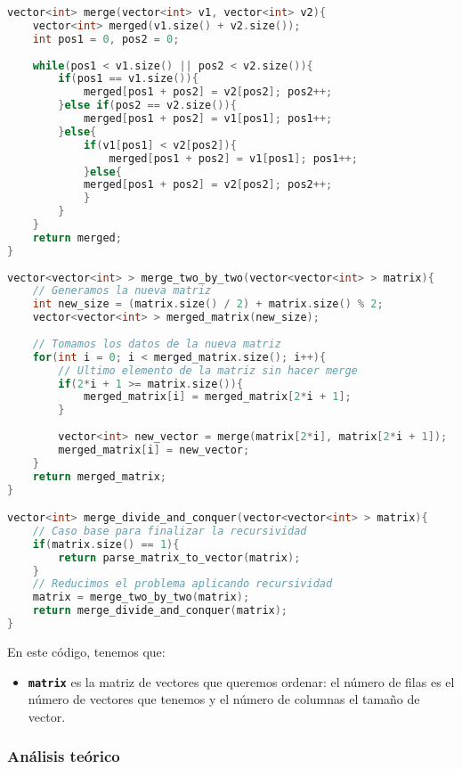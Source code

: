 \documentclass[10pt, a4paper]{article}
\theoremstyle{theorem-style}
\theoremstyle{theorem-style}
\theoremstyle{definition-style}
\theoremstyle{remark-style}
\theoremstyle{example-style}
\theoremstyle{definition-style}
\theoremstyle{remark-style}
\begin{document}
\begin{lstlisting}[language=C]
vector<int> merge(vector<int> v1, vector<int> v2){
	vector<int> merged(v1.size() + v2.size());
	int pos1 = 0, pos2 = 0;
	
	while(pos1 < v1.size() || pos2 < v2.size()){
		if(pos1 == v1.size()){
			merged[pos1 + pos2] = v2[pos2]; pos2++;
		}else if(pos2 == v2.size()){
			merged[pos1 + pos2] = v1[pos1];	pos1++;
		}else{
			if(v1[pos1] < v2[pos2]){
				merged[pos1 + pos2] = v1[pos1]; pos1++;
			}else{
			merged[pos1 + pos2] = v2[pos2]; pos2++;
			}
		}
	}
	return merged;
}
	
vector<vector<int> > merge_two_by_two(vector<vector<int> > matrix){
	// Generamos la nueva matriz
	int new_size = (matrix.size() / 2) + matrix.size() % 2;
	vector<vector<int> > merged_matrix(new_size);
	
	// Tomamos los datos de la nueva matriz
	for(int i = 0; i < merged_matrix.size(); i++){
		// Ultimo elemento de la matriz sin hacer merge
		if(2*i + 1 >= matrix.size()){
			merged_matrix[i] = merged_matrix[2*i + 1];
		}
		
		vector<int> new_vector = merge(matrix[2*i], matrix[2*i + 1]);
		merged_matrix[i] = new_vector;
	}
	return merged_matrix;
}

vector<int> merge_divide_and_conquer(vector<vector<int> > matrix){
	// Caso base para finalizar la recursividad
	if(matrix.size() == 1){
		return parse_matrix_to_vector(matrix);
	}
	// Reducimos el problema aplicando recursividad
	matrix = merge_two_by_two(matrix);
	return merge_divide_and_conquer(matrix);
}


\end{lstlisting}

En este código, tenemos que:
\begin{itemize}
	\item \textbf{\texttt{matrix}} es la matriz de vectores que queremos ordenar: el número de filas es el número de vectores que tenemos y el número de columnas el tamaño de vector.

\end{itemize}

\subsubsection{Análisis teórico}
\end{document}
